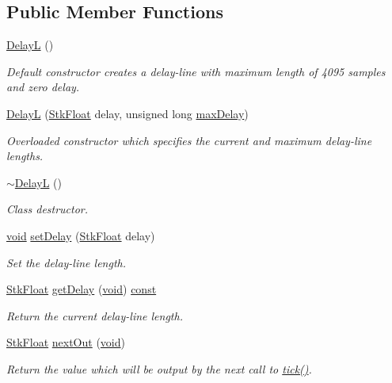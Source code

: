 \subsection*{Public Member Functions}
\begin{DoxyCompactItemize}
\item 
\hyperlink{class_nyq_1_1_delay_l_ac109de7df1c152d99253328c219c137f}{DelayL} ()
\begin{DoxyCompactList}\small\item\em Default constructor creates a delay-\/line with maximum length of 4095 samples and zero delay. \end{DoxyCompactList}\item 
\hyperlink{class_nyq_1_1_delay_l_a7035e06a7a8b54e2520215b79e38bfe2}{DelayL} (\hyperlink{namespace_nyq_a044fa20a706520a617bbbf458a7db7e4}{Stk\+Float} delay, unsigned long \hyperlink{_pit_shift_8cpp_a1c8f8a7c16de309a72f07cddd0de0eb2}{max\+Delay})
\begin{DoxyCompactList}\small\item\em Overloaded constructor which specifies the current and maximum delay-\/line lengths. \end{DoxyCompactList}\item 
\hyperlink{class_nyq_1_1_delay_l_acb9069b7dcb8e2c4c15db2caa76aa731}{$\sim$\+DelayL} ()
\begin{DoxyCompactList}\small\item\em Class destructor. \end{DoxyCompactList}\item 
\hyperlink{sound_8c_ae35f5844602719cf66324f4de2a658b3}{void} \hyperlink{class_nyq_1_1_delay_l_a70c87c2ce4be2e2d97d573737805b583}{set\+Delay} (\hyperlink{namespace_nyq_a044fa20a706520a617bbbf458a7db7e4}{Stk\+Float} delay)
\begin{DoxyCompactList}\small\item\em Set the delay-\/line length. \end{DoxyCompactList}\item 
\hyperlink{namespace_nyq_a044fa20a706520a617bbbf458a7db7e4}{Stk\+Float} \hyperlink{class_nyq_1_1_delay_l_ad87d848480a2bb8bb2d447cda27a20c5}{get\+Delay} (\hyperlink{sound_8c_ae35f5844602719cf66324f4de2a658b3}{void}) \hyperlink{getopt1_8c_a2c212835823e3c54a8ab6d95c652660e}{const} 
\begin{DoxyCompactList}\small\item\em Return the current delay-\/line length. \end{DoxyCompactList}\item 
\hyperlink{namespace_nyq_a044fa20a706520a617bbbf458a7db7e4}{Stk\+Float} \hyperlink{class_nyq_1_1_delay_l_a1c22aca75c8c7f17bdb9e0cff705ce50}{next\+Out} (\hyperlink{sound_8c_ae35f5844602719cf66324f4de2a658b3}{void})
\begin{DoxyCompactList}\small\item\em Return the value which will be output by the next call to \hyperlink{class_nyq_1_1_delay_a1ca7b9275f434e1f1b1808c2dc8b461f}{tick()}. \end{DoxyCompactList}\end{DoxyCompactItemize}
